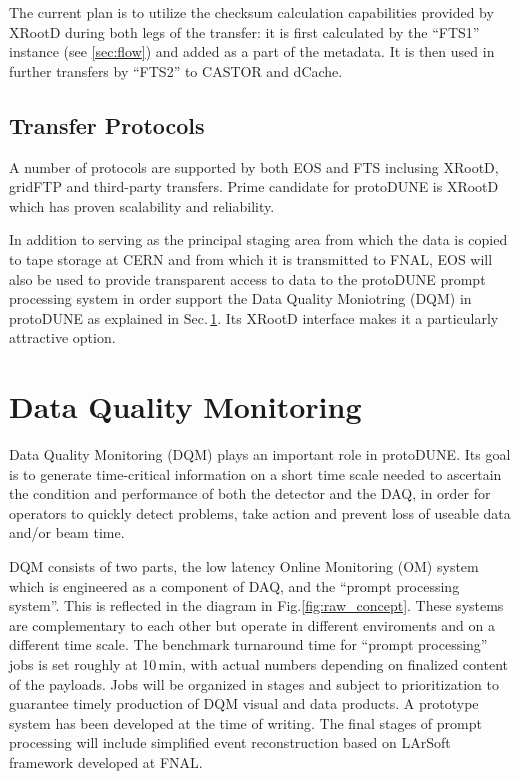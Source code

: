 \documentclass[a4paper]{jpconf}
\newcommand{\pd}{protoDUNE\xspace}
\begin{document}
The current plan is to utilize the checksum calculation capabilities provided by XRootD
during both legs of the transfer: it is first calculated by the ``FTS1'' instance
(see \ref{sec:flow}) and added as a part of the metadata. It is then used in further transfers
by ``FTS2'' to CASTOR and dCache.

\subsection{Transfer Protocols}
A number of protocols are supported by both EOS and FTS inclusing XRootD, gridFTP
and third-party transfers. Prime candidate for \pd is XRootD which has proven scalability
and reliability.

In addition to serving as the principal staging area from which the data is copied to
tape storage at CERN and from which it is transmitted to FNAL, 
EOS will also be used to provide transparent access to data to the
\pd prompt processing system 
in order support the Data Quality Moniotring (DQM) in \pd as explained in Sec.\,\ref{sec:dqm}.
Its XRootD interface makes it a particularly attractive option.

\section{Data Quality Monitoring}
\label{sec:dqm}
Data Quality Monitoring (DQM) plays an important role in \pd.
Its goal is to generate time-critical information on a short time
scale needed to ascertain the condition
and performance of both the detector and the DAQ,
in order for operators to quickly detect problems, take action and prevent loss
of useable data and/or beam time.

DQM consists of two parts,  the low latency Online Monitoring (OM)
system which is engineered as a component of DAQ, and
the ``prompt processing system''. This is reflected in the diagram
in Fig.\ref{fig:raw_concept}.
These systems are complementary to each other but operate
in different enviroments and on a different time scale.
The benchmark turnaround time for ``prompt processing'' jobs 
is set roughly at 10\,min, with actual numbers depending on
finalized content of the payloads. Jobs will be organized in stages
and subject to prioritization to guarantee timely production of DQM
visual and data products. A prototype system has been developed at
the time of writing. The final stages of prompt processing will
include simplified event reconstruction based on LArSoft framework
developed at FNAL.
\end{document}
